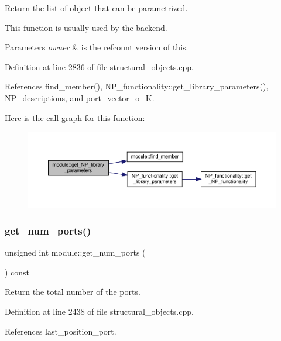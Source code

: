 Return the list of object that can be parametrized. 

This function is usually used by the backend. 
\begin{DoxyParams}{Parameters}
{\em owner} & is the refcount version of this. \\
\hline
\end{DoxyParams}


Definition at line 2836 of file structural\+\_\+objects.\+cpp.



References find\+\_\+member(), N\+P\+\_\+functionality\+::get\+\_\+library\+\_\+parameters(), N\+P\+\_\+descriptions, and port\+\_\+vector\+\_\+o\+\_\+K.

Here is the call graph for this function\+:
\nopagebreak
\begin{figure}[H]
\begin{center}
\leavevmode
\includegraphics[width=350pt]{d0/dd3/classmodule_aaa6bacd38ef58c41946a993dde301cfc_cgraph}
\end{center}
\end{figure}
\mbox{\label{classmodule_ad80631ef6588f68f317ee6ac7d9067a9}} 
\subsubsection{\texorpdfstring{get\+\_\+num\+\_\+ports()}{get\_num\_ports()}}
{\footnotesize\ttfamily unsigned int module\+::get\+\_\+num\+\_\+ports (\begin{DoxyParamCaption}{ }\end{DoxyParamCaption}) const}



Return the total number of the ports. 



Definition at line 2438 of file structural\+\_\+objects.\+cpp.



References last\+\_\+position\+\_\+port.

